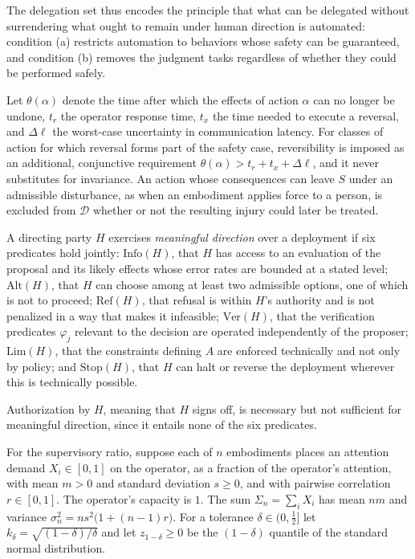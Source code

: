 The delegation set thus encodes the principle that what can be delegated without surrendering what ought to remain under human direction is automated: condition (a) restricts automation to behaviors whose safety can be guaranteed, and condition (b) removes the judgment tasks regardless of whether they could be performed safely.

\begin{remark}[Reversibility]
Let $\theta(\alpha)$ denote the time after which the effects of action $\alpha$ can no longer be undone, $t_r$ the operator response time, $t_x$ the time needed to execute a reversal, and $\Delta\ell$ the worst-case uncertainty in communication latency. For classes of action for which reversal forms part of the safety case, reversibility is imposed as an additional, conjunctive requirement $\theta(\alpha)>t_r+t_x+\Delta\ell$, and it never substitutes for invariance. An action whose consequences can leave $S$ under an admissible disturbance, as when an embodiment applies force to a person, is excluded from $\mathcal{D}$ whether or not the resulting injury could later be treated.
\end{remark}

\begin{definition}
A directing party $H$ exercises \emph{meaningful direction} over a deployment if six predicates hold jointly: $\mathrm{Info}(H)$, that $H$ has access to an evaluation of the proposal and its likely effects whose error rates are bounded at a stated level; $\mathrm{Alt}(H)$, that $H$ can choose among at least two admissible options, one of which is not to proceed; $\mathrm{Ref}(H)$, that refusal is within $H$'s authority and is not penalized in a way that makes it infeasible; $\mathrm{Ver}(H)$, that the verification predicates $\varphi_j$ relevant to the decision are operated independently of the proposer; $\mathrm{Lim}(H)$, that the constraints defining $A$ are enforced technically and not only by policy; and $\mathrm{Stop}(H)$, that $H$ can halt or reverse the deployment wherever this is technically possible.
\end{definition}

Authorization by $H$, meaning that $H$ signs off, is necessary but not sufficient for meaningful direction, since it entails none of the six predicates.

For the supervisory ratio, suppose each of $n$ embodiments places an attention demand $X_i\in[0,1]$ on the operator, as a fraction of the operator's attention, with mean $m>0$ and standard deviation $s\ge0$, and with pairwise correlation $r\in[0,1]$. The operator's capacity is $1$. The sum $\Sigma_n=\sum_iX_i$ has mean $nm$ and variance $\sigma_n^2=ns^2\big(1+(n-1)r\big)$. For a tolerance $\delta\in(0,\tfrac12]$ let $k_\delta=\sqrt{(1-\delta)/\delta}$ and let $z_{1-\delta}\ge0$ be the $(1-\delta)$ quantile of the standard normal distribution.

